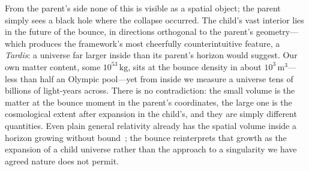 From the parent's side none of this is visible as a spatial object; the parent
simply sees a black hole where the collapse occurred. The child's vast interior
lies in the future of the bounce, in directions orthogonal to the parent's
geometry---which produces the framework's most cheerfully counterintuitive
feature, a \emph{Tardis}: a universe far larger inside than its parent's horizon
would suggest. Our own matter content, some $10^{53}\,\mathrm{kg}$, sits at the
bounce density in about $10^{3}\,\mathrm{m^3}$---less than half an Olympic
pool---yet from inside we measure a universe tens of billions of light-years
across. There is no contradiction: the small volume is the matter at the bounce
moment in the parent's coordinates, the large one is the cosmological extent after
expansion in the child's, and they are simply different quantities. Even plain
general relativity already has the spatial volume inside a horizon growing without
bound~\citep{christodoulou2015}; the bounce reinterprets that growth as the
expansion of a child universe rather than the approach to a singularity we have
agreed nature does not permit.
